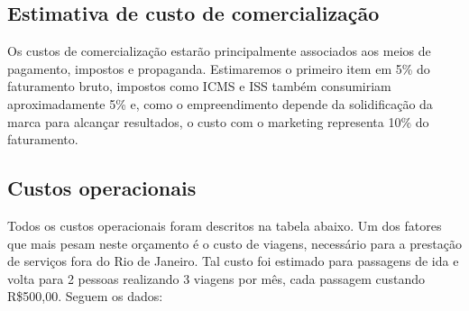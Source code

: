 \subsection{Estimativa de custo de comercialização}

Os custos de comercialização estarão principalmente associados aos meios de pagamento, impostos e propaganda. Estimaremos o primeiro item em 5\% do faturamento bruto, impostos como ICMS e ISS também consumiriam aproximadamente 5\% e, como o empreendimento depende da solidificação da marca para alcançar resultados, o custo com o marketing representa 10\% do faturamento.

\subsection{Custos operacionais}

Todos os custos operacionais foram descritos na tabela abaixo. Um dos fatores que mais pesam neste orçamento é o custo de viagens, necessário para a prestação de serviços fora do Rio de Janeiro. Tal custo foi estimado para passagens de ida e volta para 2 pessoas realizando 3 viagens por mês, cada passagem custando R\$500,00. Seguem os dados:

